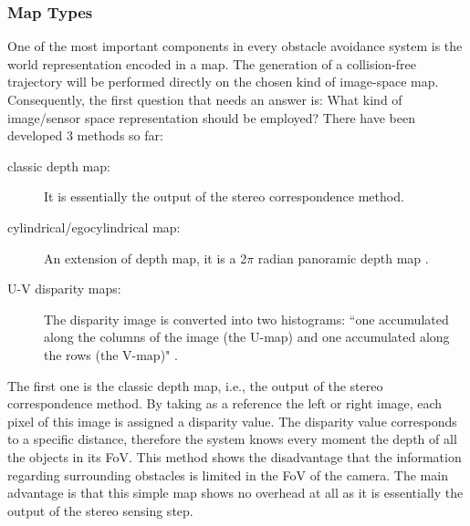 \subsubsection{Map Types}

One of the most important components in every obstacle avoidance system is the world representation encoded in a map. The generation of a collision-free trajectory will be performed directly on the chosen kind of image-space map. Consequently, the first question that needs an answer is: What kind of image/sensor space representation should be employed? There have been developed 3 methods so far:

\begin{description}
	\item [classic depth map: ] It is essentially the output of the stereo correspondence method.
	\item [cylindrical/egocylindrical map: ] An extension of depth map, it is a 2$\pi$ radian panoramic depth map \cite{Otte2009}.
	\item [U-V disparity maps: ] The disparity image is converted into two histograms: ``one accumulated along the columns of the image (the U-map) and one accumulated along the rows (the V-map)" \cite{Flata}.
\end{description}

The first one is the classic depth map, i.e., the output of the stereo correspondence method. By taking as a reference the left or right image, each pixel of this image is assigned a disparity value. The disparity value corresponds to a specific distance, therefore the system knows every moment the depth of all the objects in its \acs{FoV}. This method shows the disadvantage that the information regarding surrounding obstacles is limited in the \ac{FoV} of the camera. The main advantage is that this simple map shows no overhead at all as it is essentially the output of the stereo sensing step. 

